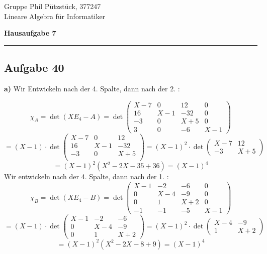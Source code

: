 \documentclass[a4paper,graphics,11pt]{article}
\newcommand{\aufgabe}[1]{\subsection*{Aufgabe #1}}
\begin{document}
\noindent Gruppe              \hfill Phil Pützstück, 377247\\
\noindent Lineare Algebra für Informatiker\\
\begin{center}
	\LARGE{\textbf{Hausaufgabe 7}}
\end{center}
\begin{center}
\rule[0.1ex]{\textwidth}{1pt}
\end{center}



\aufgabe{40}
\textbf{a)}
Wir Entwickeln nach der 4. Spalte, dann nach der 2. :

$$
    \chi_A
    = \det(XE_4 - A)
    = \det
        \begin{pmatrix}
            X-7 & 0 & 12 & 0\\
            16 & X-1 & -32 & 0\\
            -3 & 0 & X+5 & 0\\
            3 & 0 & -6 & X-1
        \end{pmatrix}
$$$$
    = (X-1)\cdot \det
        \begin{pmatrix}
            X-7 & 0 & 12 \\
            16 & X-1 & -32 \\
            -3 & 0 & X+5 \\
        \end{pmatrix}
    = (X-1)^2\cdot \det \begin{pmatrix} X-7 & 12\\ -3 & X+5\end{pmatrix}
$$$$
    = (X-1)^2(X^2-2X-35+36) = (X-1)^4
$$
Wir entwickeln nach der 4. Spalte, dann nach der 1. :
$$
    \chi_B
    = \det(XE_4 - B)
    = \det
        \begin{pmatrix}
            X-1 & -2 & -6 & 0\\
            0 & X-4 & -9 & 0\\
            0 & 1 & X+2 & 0\\
            -1 & -1 & -5 & X-1
        \end{pmatrix}
$$$$
    = (X-1)\cdot \det
        \begin{pmatrix}
            X-1 & -2 & -6 \\
            0 & X-4 & -9 \\
            0 & 1 & X+2
        \end{pmatrix}
    = (X-1)^2\cdot \det \begin{pmatrix} X-4 & -9\\ 1 & X+2\end{pmatrix}
$$$$
    = (X-1)^2(X^2-2X-8+9) = (X-1)^4
$$
\end{document}
